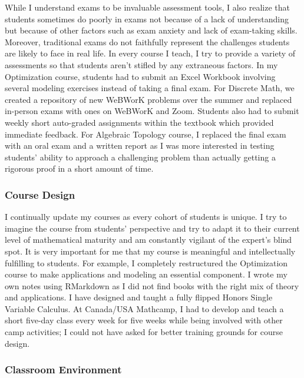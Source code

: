\documentclass[
]{report}
\begin{document}
While I understand exams to be invaluable assessment tools, I also realize that students sometimes do poorly in exams not because of a lack of understanding but because of other factors such as exam anxiety and lack of exam-taking skills.
Moreover, traditional exams do not faithfully represent the challenges students are likely to face in real life.
In every course I teach, I try to provide a variety of assessments so that students aren't stifled by any extraneous factors. In my Optimization course, students had to submit an Excel Workbook involving several modeling exercises instead of taking a final exam. For Discrete Math, we created a repository of new WeBWorK problems over the summer and replaced in-person exams with ones on WeBWorK and Zoom. Students also had to submit weekly short auto-graded assignments within the textbook which provided immediate feedback. For Algebraic Topology course, I replaced the final exam with an oral exam and a written report as I was more interested in testing students' ability to approach a challenging problem than actually getting a rigorous proof in a short amount of time.

\hypertarget{course-design}{%
\subsubsection*{Course Design}\label{course-design}}

I continually update my courses as every cohort of students is unique.
I try to imagine the course from students' perspective and try to adapt it to their current level of mathematical maturity and am constantly vigilant of the expert's blind spot.
It is very important for me that my course is meaningful and intellectually fulfilling to students.
For example, I completely restructured the Optimization course to make applications and modeling an essential component.
I wrote my own notes using RMarkdown as I did not find books with the right mix of theory and applications.
I have designed and taught a fully flipped Honors Single Variable Calculus.
At Canada/USA Mathcamp, I had to develop and teach a short five-day class every week for five weeks while being involved with other camp activities;
I could not have asked for better training grounds for course design.

\hypertarget{classroom-environment}{%
\subsubsection*{Classroom Environment}\label{classroom-environment}}
\end{document}
